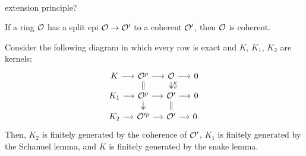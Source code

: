 \documentclass{../../large}
\begin{document}
\begin{prb}\,
\begin{parts}
\item extension principle?
\item If a ring $\mathcal{O}$ has a split epi $\mathcal{O}\to\mathcal{O}'$ to a coherent $\mathcal{O}'$, then $\mathcal{O}$ is coherent.
\end{parts}
\end{prb}
\begin{pf}
Consider the following diagram in which every row is exact and $K$, $K_1$, $K_2$ are kernels:
\[\begin{tikzcd}[sep=small]
K \rar & \cO^p \rar\dar[equals] & \cO \rar\dar[two heads] & 0\\
K_1 \rar & \cO^p \rar\dar[two heads] & \cO' \rar\dar[equals]\uar[hookrightarrow,bend right] & 0\\
K_2 \rar & \cO'^p \rar & \cO' \rar & 0.
\end{tikzcd}\]
Then, $K_2$ is finitely generated by the coherence of $\mathcal{O}'$, $K_1$ is finitely generated by the Schanuel lemma, and $K$ is finitely generated by the snake lemma.
\end{pf}




\section{}
\end{document}
